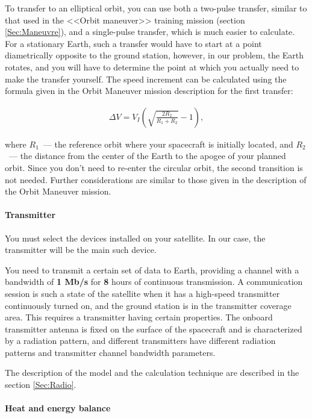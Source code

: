 \documentclass[12pt,a4paper]{article}
\begin{document}
To transfer to an elliptical orbit, you can use both a two-pulse transfer, similar to that used in the <<Orbit maneuver>> training mission (section \ref{Sec:Maneuvre}), and a single-pulse transfer, which is much easier to calculate. For a stationary Earth, such a transfer would have to start at a point diametrically opposite to the ground station, however, in our problem, the Earth rotates, and you will have to determine the point at which you actually need to make the transfer yourself. The speed increment can be calculated using the formula given in the Orbit Maneuver mission description for the first transfer:

\begin{eqnarray}
  \Delta V = V_I \left(\sqrt{\frac{2 R_2}{R_1 + R_2}} - 1 \right),
\end{eqnarray}

where $R_1$~--- the reference orbit where your spacecraft is initially located, and $R_2$~--- the distance from the center of the Earth to the apogee of your planned orbit. Since you don't need to re-enter the circular orbit, the second transition is not needed. Further considerations are similar to those given in the description of the Orbit Maneuver mission.

\paragraph{Transmitter}

You must select the devices installed on your satellite. In our case, the transmitter will be the main such device.

You need to transmit a certain set of data to Earth, providing a channel with a bandwidth of \textbf{1 Mb/s} for \textbf{8} hours of continuous transmission. A communication session is such a state of the satellite when it has a high-speed transmitter continuously turned on, and the ground station is in the transmitter coverage area. This requires a transmitter having certain properties. The onboard transmitter antenna is fixed on the surface of the spacecraft and is characterized by a radiation pattern, and different transmitters have different radiation patterns and transmitter channel bandwidth parameters.

The description of the model and the calculation technique are described in the section \ref{Sec:Radio}.

\paragraph{Heat and energy balance}
\end{document}
